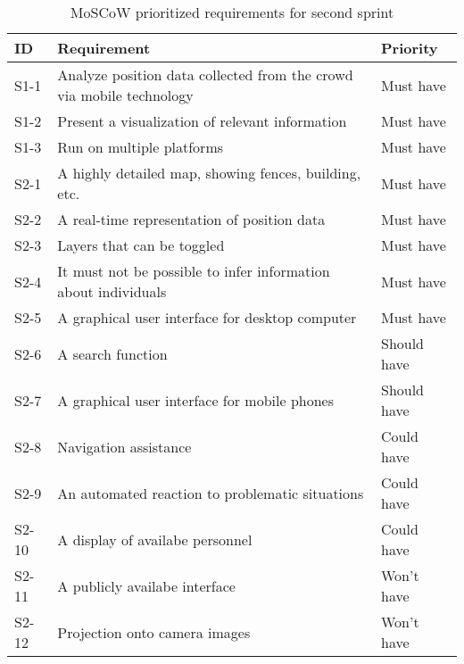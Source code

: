\begin{table}[htbp]
	\centering
	\begin{tabularx}{\textwidth}{lXl}
		\toprule
		\textbf{ID} & \textbf{Requirement} & \textbf{Priority} \\
		\toprule 
		
		\rowcolor[HTML]{EFEFEF} 
		S1-1  & Analyze position data collected from the crowd via mobile technology    & Must have \\
		S1-2  & Present a visualization of relevant information                         & Must have \\
		\rowcolor[HTML]{EFEFEF} 
		S1-3  & Run on multiple platforms                                               & Must have \\  
		S2-1  & A highly detailed map, showing fences, building, etc.                   & Must have \\
		\rowcolor[HTML]{EFEFEF} 
		S2-2  & A real-time representation of position data                                & Must have \\
		S2-3  & Layers that can be toggled                                                 & Must have \\
		\rowcolor[HTML]{EFEFEF} 
		S2-4  & It must not be possible to infer information about individuals             & Must have \\ 
		S2-5  & A graphical user interface for desktop computer & Must have \\
		\rowcolor[HTML]{EFEFEF} 
		S2-6  & A search function & Should have \\
		S2-7  & A graphical user interface for mobile phones & Should have \\
		\rowcolor[HTML]{EFEFEF} 
		S2-8  & Navigation assistance & Could have \\ 
		S2-9  & An automated reaction to problematic situations & Could have \\
		\rowcolor[HTML]{EFEFEF} 
		S2-10 & A display of availabe personnel & Could have \\
		S2-11 & A publicly availabe interface & Won't have \\
		\rowcolor[HTML]{EFEFEF} 
		S2-12 & Projection onto camera images & Won't have \\       
		\bottomrule
	\end{tabularx}
	\caption{MoSCoW prioritized requirements for second sprint}
	\label{tab:s2_req}
\end{table}





